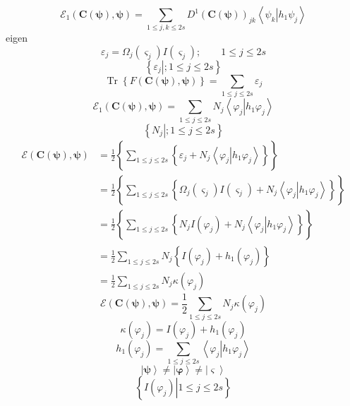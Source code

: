 \documentclass[aps,preprint]{revtex4}%
\begin{document}
\[
\mathcal{E}_{1}\left(  \mathbf{C}\left(  \mathbf{\psi}\right)  ,\mathbf{\psi
}\right)  =\sum_{1\leq j,k\leq2s}D^{1}\left(  \mathbf{C}\left(  \mathbf{\psi
}\right)  \right)  _{jk}\left\langle \left.  \psi_{k}\right\vert h_{1}\psi
_{j}\right\rangle
\]
eigen%
\[
\varepsilon_{j}=\Omega_{j}\left(  \varsigma_{j}\right)  I\left(  \varsigma
_{j}\right)  ;\qquad1\leq j\leq2s
\]%
\[
\left\{  \left.  \varepsilon_{j}\right\vert ;1\leq j\leq2s\right\}
\]%
\[
\operatorname{Tr}\left\{  F\left(  \mathbf{C}\left(  \mathbf{\psi}\right)
,\mathbf{\psi}\right)  \right\}  =\sum_{1\leq j\leq2s}\varepsilon_{j}%
\]%
\[
\mathcal{E}_{1}\left(  \mathbf{C}\left(  \mathbf{\psi}\right)  ,\mathbf{\psi
}\right)  =\sum_{1\leq j\leq2s}N_{j}\left\langle \left.  \varphi
_{j}\right\vert h_{1}\varphi_{j}\right\rangle
\]%
\[
\left\{  \left.  N_{j}\right\vert ;1\leq j\leq2s\right\}
\]%
\begin{align*}
\mathcal{E}\left(  \mathbf{C}\left(  \mathbf{\psi}\right)  ,\mathbf{\psi
}\right)   &  =\frac{1}{2}\left\{  \overset{}{\sum_{1\leq j\leq2s}\left\{
\varepsilon_{j}+N_{j}\left\langle \left.  \varphi_{j}\right\vert h_{1}%
\varphi_{j}\right\rangle \right\}  }\right\} \\
&  =\frac{1}{2}\left\{  \overset{}{\sum_{1\leq j\leq2s}\left\{  \Omega
_{j}\left(  \varsigma_{j}\right)  I\left(  \varsigma_{j}\right)
+N_{j}\left\langle \left.  \varphi_{j}\right\vert h_{1}\varphi_{j}%
\right\rangle \right\}  }\right\} \\
&  =\frac{1}{2}\left\{  \overset{}{\sum_{1\leq j\leq2s}\left\{  N_{j}I\left(
\varphi_{j}\right)  +N_{j}\left\langle \left.  \varphi_{j}\right\vert
h_{1}\varphi_{j}\right\rangle \right\}  }\right\} \\
&  =\frac{1}{2}\overset{}{\sum_{1\leq j\leq2s}N_{j}\left\{  I\left(
\varphi_{j}\right)  +h_{1}\left(  \varphi_{j}\right)  \right\}  }\\
&  =\frac{1}{2}\sum_{1\leq j\leq2s}N_{j}\kappa\left(  \varphi_{j}\right)
\end{align*}%
\[
\mathcal{E}\left(  \mathbf{C}\left(  \mathbf{\psi}\right)  ,\mathbf{\psi
}\right)  =\frac{1}{2}\sum_{1\leq j\leq2s}N_{j}\kappa\left(  \varphi
_{j}\right)
\]%
\[
\kappa\left(  \varphi_{j}\right)  =I\left(  \varphi_{j}\right)  +h_{1}\left(
\varphi_{j}\right)
\]%
\[
h_{1}\left(  \varphi_{j}\right)  =\sum_{1\leq j\leq2s}\left\langle \left.
\varphi_{j}\right\vert h_{1}\varphi_{j}\right\rangle
\]%
\[
\left\vert \mathbf{\psi}\right\rangle \neq\left\vert \mathbf{\varphi
}\right\rangle \neq\left\vert \mathbf{\varsigma}\right\rangle
\]%
\[
\left\{  \left.  I\left(  \varphi_{j}\right)  \right\vert 1\leq j\leq
2s\right\}
\]%
\end{document}
